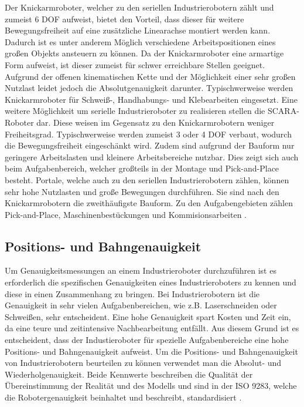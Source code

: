 Der Knickarmroboter, welcher zu den seriellen Industrierobotern zählt und zumeist 6 DOF aufweist, bietet den Vorteil, dass dieser für weitere Bewegungsfreiheit auf eine zusätzliche Linearachse montiert werden kann. Dadurch ist es unter anderem Möglich verschiedene Arbeitspositionen eines großen Objekts ansteuern zu können. Da der Knickarmroboter eine armartige Form aufweist, ist dieser zumeist für schwer erreichbare Stellen geeignet. Aufgrund der offenen kinematischen Kette und der Möglichkeit einer sehr großen Nutzlast leidet jedoch die Absolutgenauigkeit darunter. Typischwerweise werden Knickarmroboter für Schweiß-, Handhabungs- und Klebearbeiten eingesetzt. Eine weitere Möglichkeit um serielle Industrieroboter zu realisieren stellen die SCARA-Roboter dar. Diese weisen im Gegensatz zu den Knickarmrobotern weniger Freiheitsgrad. Typischwerweise werden zumeist 3 oder 4 DOF verbaut, wodurch die Bewegungsfreiheit eingeschänkt wird. Zudem sind aufgrund der Bauform nur geringere Arbeitslasten und kleinere Arbeitsbereiche nutzbar. Dies zeigt sich auch beim Aufgabenbereich, welcher großteils in der Montage und Pick-and-Place besteht. Portale, welche auch zu den seriellen Industrierobotern zählen, können sehr hohe Nutzlasten und große Bewegungen durchführen. Sie sind nach den Knickarmrobotern die zweithäufigste Bauform. Zu den Aufgabengebieten zählen Pick-and-Place, Maschinenbestückungen und Kommisionsarbeiten \cite[17\psqq]{pott_industrielle_2019}.

\subsection{Positions- und Bahngenauigkeit}
Um Genauigkeitsmessungen an einem Industrieroboter durchzuführen ist es erforderlich die spezifischen Genauigkeiten eines Industrieroboters zu kennen und diese in einen Zusammenhang zu bringen. Bei Industrierobotern ist die Genauigkeit in sehr vielen Aufgabenbereichen, wie z.B. Laserschneiden oder Schweißen, sehr entscheident. Eine hohe Genauigkeit spart Kosten und Zeit ein, da eine teure und zeitintensive Nachbearbeitung entfällt. Aus diesem Grund ist es entscheident, dass der Industieroboter für spezielle Aufgabenbereiche eine hohe Positions- und Bahngenauigkeit aufweist. Um die Positions- und Bahngenauigkeit von Industrierobotern beurteilen zu können verwendet man die Absolut- und Wiederholgenauigkeit. Beide Kennwerte beschreiben die Qualität der Übereinstimmung der Realität und des Modells und sind in der ISO 9283, welche die Robotergenauigkeit beinhaltet und beschreibt, standardisiert \cite[28\psqq]{pott_industrielle_2019}.

